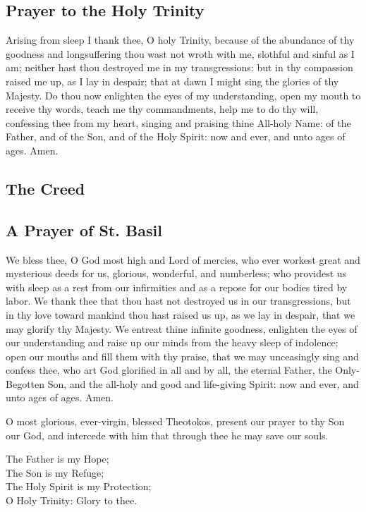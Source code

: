 \subsection{Prayer to the Holy Trinity}

Arising from sleep I thank thee, O holy Trinity, because of the abundance of thy goodness and longsuffering thou wast not wroth with me, slothful and sinful as I am; neither hast thou destroyed me in my transgressions: but in thy compassion raised me up, as I lay in despair; that at dawn I might sing the glories of thy Majesty. Do thou now enlighten the eyes of my understanding, open my mouth to receive thy words, teach me thy commandments, help me to do thy will, confessing thee from my heart, singing and praising thine All-holy Name: of the Father, and of the Son, and of the Holy Spirit: now and ever, and unto ages of ages. Amen.

\subsection{The Creed}



\subsection{A Prayer of St. Basil}

We bless thee, O God most high and Lord of mercies, who ever workest great and mysterious deeds for us, glorious, wonderful, and numberless; who providest us with sleep as a rest from our infirmities and as a repose for our bodies tired by labor. We thank thee that thou hast not destroyed us in our transgressions, but in thy love toward mankind thou hast raised us up, as we lay in despair, that we may glorify thy Majesty. We entreat thine infinite goodness, enlighten the eyes of our understanding and raise up our minds from the heavy sleep of indolence; open our mouths and fill them with thy praise, that we may unceasingly sing and confess thee, who art God glorified in all and by all, the eternal Father, the Only-Begotten Son, and the all-holy and good and life-giving Spirit: now and ever, and unto ages of ages. Amen.

O most glorious, ever-virgin, blessed Theotokos, present our prayer to thy Son our God, and intercede with him that through thee he may save our souls.

The Father is my Hope; \\
The Son is my Refuge; \\
The Holy Spirit is my Protection; \\
O Holy Trinity: Glory to thee.

